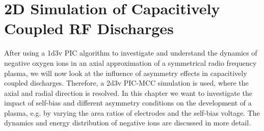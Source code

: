 %
\chapter{2D Simulation of Capacitively Coupled RF Discharges}\label{sec:chapter_twodccrf}
%
    After using a 1d3v PIC algorithm to investigate and understand the dynamics of negative oxygen ions in an axial approximation of a symmetrical radio frequency plasma, we will now look at the influence of asymmetry effects in capacitively coupled discharges. Therefore, a 2d3v PIC-MCC simulation is used, where the axial and radial direction is resolved. In this chapter we want to investigate the impact of self-bias and different asymmetry conditions on the development of a plasma, e.g. by varying the area ratios of electrodes and the self-bias voltage. The dynamics and energy distribution of negative ions are discussed in more detail.
%
